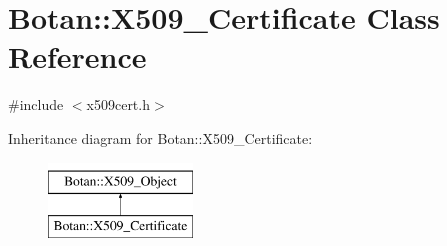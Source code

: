 \hypertarget{classBotan_1_1X509__Certificate}{\section{Botan\-:\-:X509\-\_\-\-Certificate Class Reference}
\label{classBotan_1_1X509__Certificate}
}


{\ttfamily \#include $<$x509cert.\-h$>$}

Inheritance diagram for Botan\-:\-:X509\-\_\-\-Certificate\-:\begin{figure}[H]
\begin{center}
\leavevmode
\includegraphics[height=2.000000cm]{classBotan_1_1X509__Certificate}
\end{center}
\end{figure}
